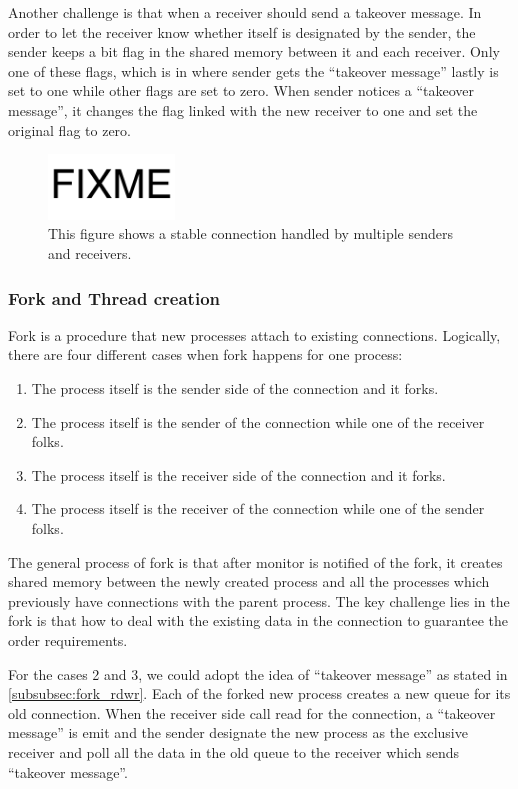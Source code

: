Another challenge is that when a receiver should send a takeover message. In order to let the receiver know whether itself is designated by the sender, the sender keeps a bit flag in the shared memory between it and each receiver.  Only one of these flags, which is in where sender gets the ``takeover message'' lastly is set to one while other flags are set to zero. When sender notices a ``takeover message'', it changes the flag linked with the new receiver to one and set the original flag to zero.

\begin{figure}[t]
	\centering
	\includegraphics[width=0.3\textwidth]{images/fixme}
	\caption{This figure shows a stable connection handled by multiple senders and receivers.}
	\label{fig:fork-bipartitegraph}
\end{figure}

\subsubsection{Fork and Thread creation}
Fork is a procedure that new processes attach to existing connections. Logically, there are four different cases when fork happens for one process:
\begin{enumerate}
	\item The process itself is the sender side of the connection and it forks.
	\item The process itself is the sender of the connection while one of the receiver folks.
	\item The process itself is the receiver side of the connection and it forks.
	\item The process itself is the receiver of the connection while one of the sender folks.
\end{enumerate}

The general process of fork is that after monitor is notified of the fork, it creates shared memory between the newly created process and all the processes which previously have connections with the parent process. The key challenge lies in the fork is that how to deal with the existing data in the connection to guarantee the order requirements.

For the cases 2 and 3, we could adopt the idea of ``takeover message'' as stated in \ref{subsubsec:fork_rdwr}. Each of the forked new process creates a new queue for its old connection. When the receiver side call read for the connection, a ``takeover message'' is emit and the sender designate the new process as the exclusive receiver and poll all the data in the old queue to the receiver which sends ``takeover message''.

